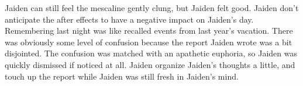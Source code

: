 \documentclass[12pt]{book}
\begin{document}
Jaiden can still feel the mescaline gently clung, but Jaiden felt good. Jaiden don't anticipate the after effects to have a negative impact on Jaiden's day. Remembering last night was like recalled events from last year's vacation. There was obviously some level of confusion because the report Jaiden wrote was a bit disjointed. The confusion was matched with an apathetic euphoria, so Jaiden was quickly dismissed if noticed at all. Jaiden organize Jaiden's thoughts a little, and touch up the report while Jaiden was still fresh in Jaiden's mind.
\end{document}
